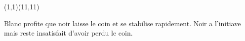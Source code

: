 \documentclass[preview, border=0pt, varwidth=false]{standalone}
\begin{document}
	\setgounit{0.6cm} 
	
\parbox[c][14.65cm][c]{10.2cm}{
	\centering
	
	\begin{psgopartialboard}{(1,1)(11,11)}
		\pass*
		\pass
	\end{psgopartialboard}
	
	\vspace{1em}	
Blanc profite que noir laisse le coin et se stabilise rapidement. Noir a l'initiave mais reste insatisfait d'avoir perdu le coin.}
\end{document}
